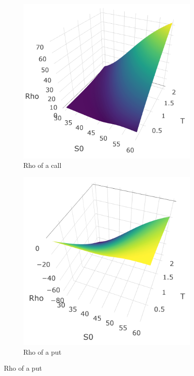 \documentclass[hidelinks]{article}
\begin{document}
    
    \begin{figure}[!h]
	\centering
	\caption{Rho surfaces}
  \begin{subfigure}[b]{0.45\textwidth}
    \includegraphics[width=\textwidth]{rho_call.png}
    \caption{Rho of a call}
    \label{fig:Rho_call}
  \end{subfigure}
  \begin{subfigure}[b]{0.45\textwidth}
    \includegraphics[width=\textwidth]{rho_put.png}
    \caption{Rho of a put}
    \label{fig:rho_put}
  \end{subfigure}
\end{figure}
\end{document}

